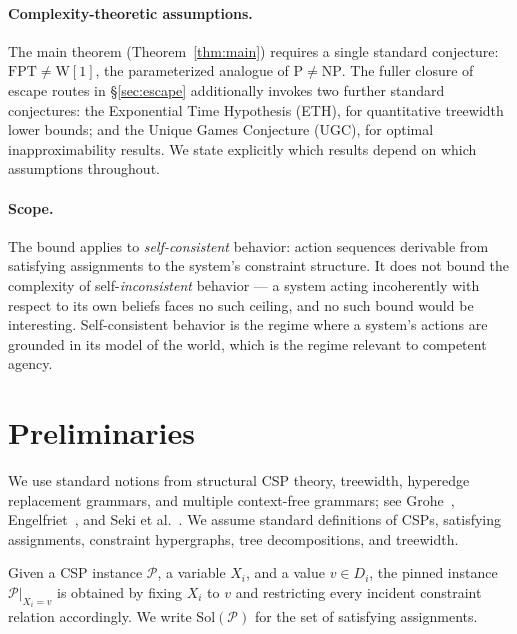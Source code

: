 \documentclass[runningheads]{llncs}
\begin{document}
\paragraph{Complexity-theoretic assumptions.}
The main theorem (Theorem~\ref{thm:main}) requires a single standard conjecture: $\mathrm{FPT} \neq \mathrm{W}[1]$, the parameterized analogue of $\mathrm{P} \neq \mathrm{NP}$.
The fuller closure of escape routes in \S\ref{sec:escape} additionally invokes two further standard conjectures: the Exponential Time Hypothesis (ETH), for quantitative treewidth lower bounds; and the Unique Games Conjecture (UGC), for optimal inapproximability results.
We state explicitly which results depend on which assumptions throughout.

\paragraph{Scope.}
The bound applies to \emph{self-consistent} behavior: action sequences derivable from satisfying assignments to the system's constraint structure.
It does not bound the complexity of self-\emph{inconsistent} behavior --- a system acting incoherently with respect to its own beliefs faces no such ceiling, and no such bound would be interesting.
Self-consistent behavior is the regime where a system's actions are grounded in its model of the world, which is the regime relevant to competent agency.

\section{Preliminaries}\label{sec:prelim}

We use standard notions from structural CSP theory, treewidth, hyperedge replacement grammars, and multiple context-free grammars; see Grohe~\cite{Grohe07}, Engelfriet~\cite{Engelfriet97}, and Seki et al.~\cite{Seki91}. We assume standard definitions of CSPs, satisfying assignments, constraint hypergraphs, tree decompositions, and treewidth.

\begin{definition}\label{def:pinned}
Given a CSP instance $\mathcal{P}$, a variable $X_i$, and a value $v \in D_i$, the pinned instance $\mathcal{P}|_{X_i = v}$ is obtained by fixing $X_i$ to $v$ and restricting every incident constraint relation accordingly. We write $\mathrm{Sol}(\mathcal{P})$ for the set of satisfying assignments.
\end{definition}
\end{document}
